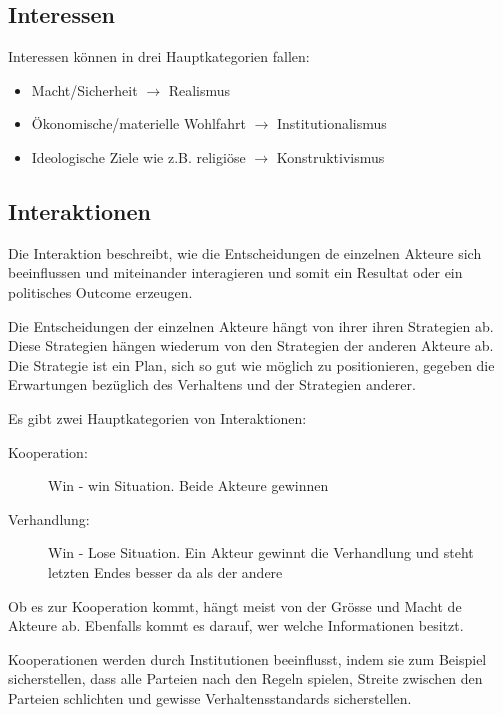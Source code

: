 \documentclass[a4paper, 11pt]{article}
\begin{document}
\subsection{Interessen}
Interessen können in drei Hauptkategorien fallen:

\begin{itemize}
	\item Macht/Sicherheit $\rightarrow$ Realismus
	\item Ökonomische/materielle Wohlfahrt $\rightarrow$ Institutionalismus
	\item Ideologische Ziele wie z.B. religiöse $\rightarrow$ Konstruktivismus
\end{itemize}

\subsection{Interaktionen}
Die Interaktion beschreibt, wie die Entscheidungen de einzelnen Akteure sich beeinflussen und miteinander interagieren und somit ein Resultat oder ein politisches Outcome erzeugen.

\vspace{10px}

\noindent Die Entscheidungen der einzelnen Akteure hängt von ihrer ihren Strategien ab. Diese Strategien hängen wiederum von den Strategien der anderen Akteure ab. \\

Die Strategie ist ein Plan, sich so gut wie möglich zu positionieren, gegeben die Erwartungen bezüglich des Verhaltens und der Strategien anderer.

\vspace{10px}

\noindent Es gibt zwei Hauptkategorien von Interaktionen:
\begin{description}
	\item[Kooperation: ] Win - win Situation. Beide Akteure gewinnen
	\item[Verhandlung: ] Win - Lose Situation. Ein Akteur gewinnt die Verhandlung und steht letzten Endes besser da als der andere
\end{description}

Ob es zur Kooperation kommt, hängt meist von der Grösse und Macht de Akteure ab. Ebenfalls kommt es darauf, wer welche Informationen besitzt.

Kooperationen werden durch Institutionen beeinflusst, indem sie zum Beispiel sicherstellen, dass alle Parteien nach den Regeln spielen, Streite zwischen den Parteien schlichten und gewisse Verhaltensstandards sicherstellen.
\end{document}
